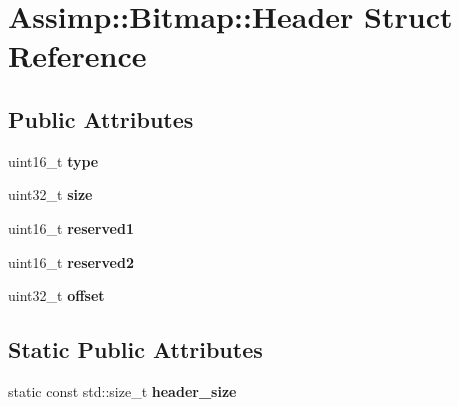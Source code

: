 \hypertarget{struct_assimp_1_1_bitmap_1_1_header}{\section{Assimp\+:\+:Bitmap\+:\+:Header Struct Reference}
\label{struct_assimp_1_1_bitmap_1_1_header}
}
\subsection*{Public Attributes}
\begin{DoxyCompactItemize}
\item 
\hypertarget{struct_assimp_1_1_bitmap_1_1_header_a06473e47eb40838c66474e3b6155d5d1}{uint16\+\_\+t {\bfseries type}}\label{struct_assimp_1_1_bitmap_1_1_header_a06473e47eb40838c66474e3b6155d5d1}

\item 
\hypertarget{struct_assimp_1_1_bitmap_1_1_header_a1e75ec49a56dd7846bccaed9115a39d8}{uint32\+\_\+t {\bfseries size}}\label{struct_assimp_1_1_bitmap_1_1_header_a1e75ec49a56dd7846bccaed9115a39d8}

\item 
\hypertarget{struct_assimp_1_1_bitmap_1_1_header_a3c1c022bfff7d79d567ef9a2c70f9b7d}{uint16\+\_\+t {\bfseries reserved1}}\label{struct_assimp_1_1_bitmap_1_1_header_a3c1c022bfff7d79d567ef9a2c70f9b7d}

\item 
\hypertarget{struct_assimp_1_1_bitmap_1_1_header_a1df418b87a2ed1fd5c3661fbfbb4155c}{uint16\+\_\+t {\bfseries reserved2}}\label{struct_assimp_1_1_bitmap_1_1_header_a1df418b87a2ed1fd5c3661fbfbb4155c}

\item 
\hypertarget{struct_assimp_1_1_bitmap_1_1_header_a914920645985790cb0d3891f161160c1}{uint32\+\_\+t {\bfseries offset}}\label{struct_assimp_1_1_bitmap_1_1_header_a914920645985790cb0d3891f161160c1}

\end{DoxyCompactItemize}
\subsection*{Static Public Attributes}
\begin{DoxyCompactItemize}
\item 
static const std\+::size\+\_\+t {\bfseries header\+\_\+size}
\end{DoxyCompactItemize}


